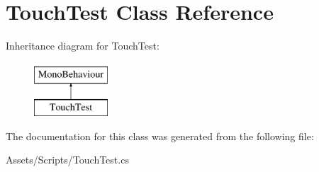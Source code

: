 \hypertarget{class_touch_test}{}\section{Touch\+Test Class Reference}
\label{class_touch_test}
Inheritance diagram for Touch\+Test\+:\begin{figure}[H]
\begin{center}
\leavevmode
\includegraphics[height=2.000000cm]{class_touch_test}
\end{center}
\end{figure}


The documentation for this class was generated from the following file\+:\begin{DoxyCompactItemize}
\item 
Assets/\+Scripts/Touch\+Test.\+cs\end{DoxyCompactItemize}
